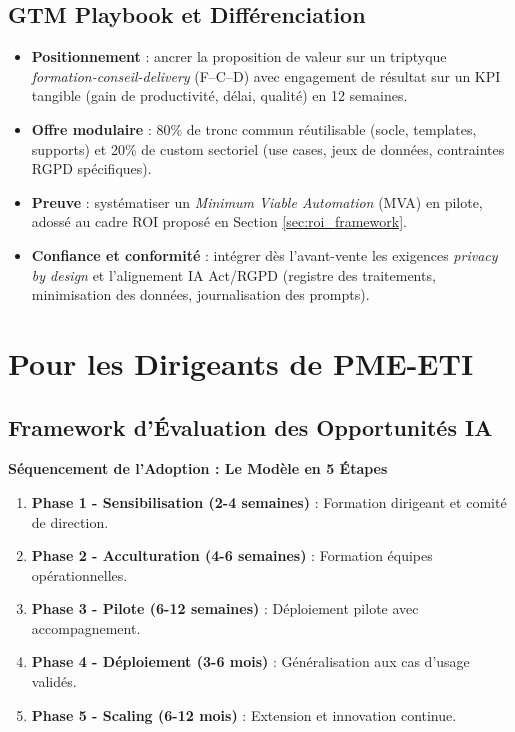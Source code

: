 \subsection{GTM Playbook et Différenciation}
\begin{itemize}
    \item \textbf{Positionnement} : ancrer la proposition de valeur sur un triptyque \emph{formation-conseil-delivery} (F–C–D) avec engagement de résultat sur un KPI tangible (gain de productivité, délai, qualité) en 12 semaines.
    \item \textbf{Offre modulaire} : 80\% de tronc commun réutilisable (socle, templates, supports) et 20\% de custom sectoriel (use cases, jeux de données, contraintes RGPD spécifiques).
    \item \textbf{Preuve} : systématiser un \emph{Minimum Viable Automation} (MVA) en pilote, adossé au cadre ROI proposé en Section \ref{sec:roi_framework}.
    \item \textbf{Confiance et conformité} : intégrer dès l’avant-vente les exigences \emph{privacy by design} et l’alignement IA Act/RGPD (registre des traitements, minimisation des données, journalisation des prompts).
\end{itemize}

\section{Pour les Dirigeants de PME-ETI}

\subsection{Framework d'Évaluation des Opportunités IA}

\textbf{Séquencement de l'Adoption : Le Modèle en 5 Étapes}
\begin{enumerate}
    \item \textbf{Phase 1 - Sensibilisation (2-4 semaines)} : Formation dirigeant et comité de direction.
    \item \textbf{Phase 2 - Acculturation (4-6 semaines)} : Formation équipes opérationnelles.
    \item \textbf{Phase 3 - Pilote (6-12 semaines)} : Déploiement pilote avec accompagnement.
    \item \textbf{Phase 4 - Déploiement (3-6 mois)} : Généralisation aux cas d'usage validés.
    \item \textbf{Phase 5 - Scaling (6-12 mois)} : Extension et innovation continue.
\end{enumerate}

